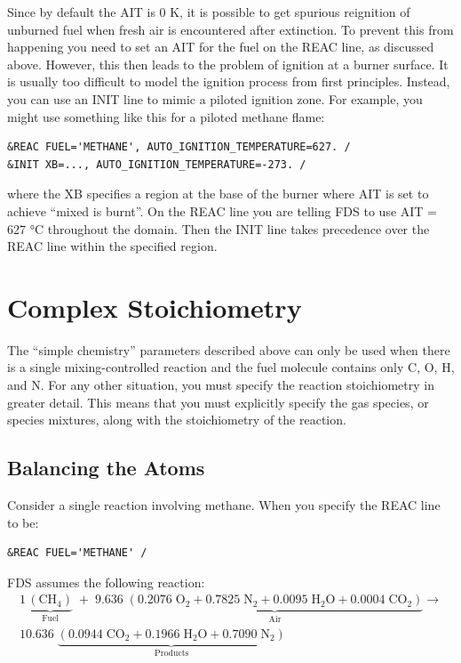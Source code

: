 \documentclass[11pt]{book}
\begin{document}
Since by default the AIT is 0 K, it is possible to get spurious reignition of unburned fuel when fresh air is encountered after extinction.  To prevent this from happening you need to set an AIT for the fuel on the {\ct REAC} line, as discussed above.  However, this then leads to the problem of ignition at a burner surface.  It is usually too difficult to model the ignition process from first principles.  Instead, you can use an {\ct INIT} line to mimic a piloted ignition zone. For example, you might use something like this for a piloted methane flame:
\begin{lstlisting}
&REAC FUEL='METHANE', AUTO_IGNITION_TEMPERATURE=627. /
&INIT XB=..., AUTO_IGNITION_TEMPERATURE=-273. /
\end{lstlisting}
where the {\ct XB} specifies a region at the base of the burner where AIT is set to achieve ``mixed is burnt''.  On the {\ct REAC} line you are telling FDS to use AIT = 627 \si{\degreeCelsius} throughout the domain.  Then the {\ct INIT} line takes precedence over the {\ct REAC} line within the specified region.


\newpage

\section{Complex Stoichiometry}
\label{info:REAC_Diagnostics}

The ``simple chemistry'' parameters described above can only be used when there is a single mixing-controlled reaction and the fuel molecule contains only C, O, H, and N.
For any other situation, you must specify the reaction stoichiometry in greater detail. This means that you must explicitly specify the gas species, or species mixtures, along with
the stoichiometry of the reaction.

\subsection{Balancing the Atoms}

Consider a single reaction involving methane. When you specify the {\ct REAC} line to be:

\begin{lstlisting}
&REAC FUEL='METHANE' /
\end{lstlisting}

\noindent FDS assumes the following reaction:
\begin{multline}
1\,\underbrace{\mathrm{ (CH_4) }}_\text{Fuel} \; + \;
9.636 \; \underbrace{ \mathrm{\left( 0.2076 \; O_2 + 0.7825 \; N_2 + 0.0095 \; H_2O + 0.0004 \; CO_2 \right)}}_\text{Air} \longrightarrow \\
10.636 \; \underbrace{\mathrm{(0.0944 \; CO_2 +  0.1966 \; H_2O + 0.7090 \; N_2)}}_\text{Products}
\end{multline}
\end{document}
